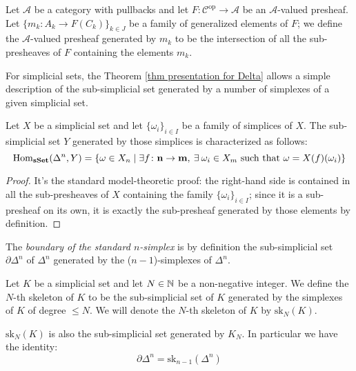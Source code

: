 \begin{refsection}
\begin{defin}
Let $\mathcal A$ be a category with pullbacks and let $F \colon \mathcal C^{\mathrm{op}} \to \mathcal A$ be an $\mathcal A$-valued presheaf. Let $\{m_k \colon A_k \to F(C_k)\}_{k \in J}$ be a family of generalized elements of $F$; we define the $\mathcal A$-valued presheaf generated by $m_k$ to be the intersection of all the sub-presheaves of $F$ containing the elements $m_k$.
\end{defin}

For simplicial sets, the Theorem \ref{thm presentation for Delta} allows a simple description of the sub-simplicial set generated by a number of simplexes of a given simplicial set.

\begin{prop} \label{prop sub simplicial set}
Let $X$ be a simplicial set and let $\{\omega_i\}_{i \in I}$ be a family of simplices of $X$. The sub-simplicial set $Y$ generated by those simplices is characterized as follows:
\[
\mathrm{Hom}_{\mathbf{sSet}}(\Delta^n,Y) = \{\omega \in X_n \mid \exists f \colon \mathbf n \to \mathbf m, \: \exists \: \omega_i \in X_m \text{ such that } \omega = X(f)(\omega_i) \}
\]
\end{prop}

\begin{proof}
It's the standard model-theoretic proof: the right-hand side is contained in all the sub-presheaves of $X$ containing the family $\{\omega_i\}_{i \in I}$; since it is a sub-presheaf on its own, it is exactly the sub-presheaf generated by those elements by definition.
\end{proof}

\begin{defin}
The \emph{boundary of the standard $n$-simplex} is by definition the sub-simplicial set $\partial \Delta^n$ of $\Delta^n$ generated by the ($n-1$)-simplexes of $\Delta^n$.
\end{defin}

\begin{defin}
Let $K$ be a simplicial set and let $N \in \mathbb{N}$ be a non-negative integer. We define the $N$-th skeleton of $K$ to be the sub-simplicial set of $K$ generated by the simplexes of $K$ of degree $\le N$. We will denote the $N$-th skeleton of $K$ by $\mathrm{sk}_N(K)$.
\end{defin}

\begin{rmk}
$\mathrm{sk}_N(K)$ is also the sub-simplicial set generated by $K_N$. In particular we have the identity:
\[
\partial \Delta^n = \mathrm{sk}_{n-1}(\Delta^n)
\]
\end{rmk}


\end{refsection}
